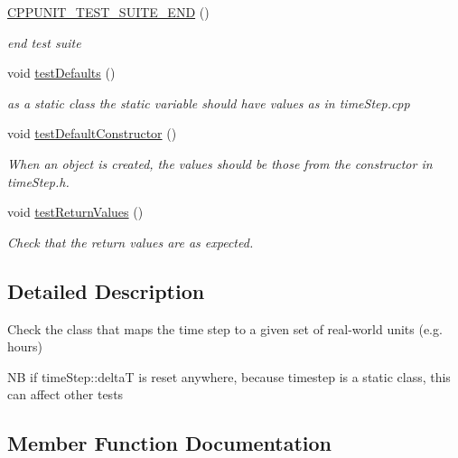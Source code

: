 \begin{DoxyCompactItemize}
\mbox{\label{classtimeStepTest_a9d77630b4ebb30faacc9627d0739c836}} 
\mbox{\hyperlink{classtimeStepTest_a9d77630b4ebb30faacc9627d0739c836}{C\+P\+P\+U\+N\+I\+T\+\_\+\+T\+E\+S\+T\+\_\+\+S\+U\+I\+T\+E\+\_\+\+E\+ND}} ()
\begin{DoxyCompactList}\small\item\em end test suite \end{DoxyCompactList}\item 
\mbox{\label{classtimeStepTest_ae501f2f63633a2b24c4cfc1f9c33f96b}} 
void \mbox{\hyperlink{classtimeStepTest_ae501f2f63633a2b24c4cfc1f9c33f96b}{test\+Defaults}} ()
\begin{DoxyCompactList}\small\item\em as a static class the static variable should have values as in time\+Step.\+cpp \end{DoxyCompactList}\item 
\mbox{\label{classtimeStepTest_a3e6e3abcb3b887cd3ebbbacb3c6a812f}} 
void \mbox{\hyperlink{classtimeStepTest_a3e6e3abcb3b887cd3ebbbacb3c6a812f}{test\+Default\+Constructor}} ()
\begin{DoxyCompactList}\small\item\em When an object is created, the values should be those from the constructor in time\+Step.\+h. \end{DoxyCompactList}\item 
void \mbox{\hyperlink{classtimeStepTest_abb17f1970e1ec459c524ef87870f651f}{test\+Return\+Values}} ()
\begin{DoxyCompactList}\small\item\em Check that the return values are as expected. \end{DoxyCompactList}\end{DoxyCompactItemize}


\subsection{Detailed Description}
Check the class that maps the time step to a given set of real-\/world units (e.\+g. hours) 

NB if time\+Step\+::deltaT is reset anywhere, because timestep is a static class, this can affect other tests 

\subsection{Member Function Documentation}
\mbox{\label{classtimeStepTest_abb17f1970e1ec459c524ef87870f651f}} 
